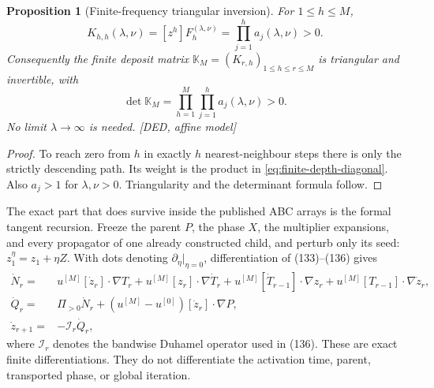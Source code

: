 \documentclass[11pt]{amsart}
\numberwithin{equation}{section}
\theoremstyle{plain}
\newtheorem{proposition}[theorem]{Proposition}
\theoremstyle{definition}
\theoremstyle{remark}
\begin{document}
\begin{proposition}[Finite-frequency triangular inversion]
\label{prop:finite-frequency-depth-inversion}
For $1\le h\le M$,
\begin{equation}
 K_{h,h}(\lambda,\nu)=[z^h]F_h^{(\lambda,\nu)}
 =\prod_{j=1}^h a_j(\lambda,\nu)>0.
\label{eq:finite-depth-diagonal}
\end{equation}
Consequently the finite deposit matrix
$\mathbb K_M=(K_{r,h})_{1\le h\le r\le M}$ is triangular and invertible,
with
\begin{equation}
 \det\mathbb K_M
 =\prod_{h=1}^M\prod_{j=1}^h a_j(\lambda,\nu)>0.
\label{eq:finite-depth-determinant}
\end{equation}
No limit $\lambda\to\infty$ is needed.  \textup{[DED, affine model]}
\end{proposition}

\begin{proof}
To reach zero from $h$ in exactly $h$ nearest-neighbour steps there is only
the strictly descending path.  Its weight is the product in
\eqref{eq:finite-depth-diagonal}.  Also $a_j>1$ for $\lambda,\nu>0$.
Triangularity and the determinant formula follow.
\end{proof}

The exact part that does survive inside the published ABC arrays is the
formal tangent recursion.  Freeze the parent $P$, the phase $X$, the
multiplier expansions, and every propagator of one already constructed
child, and perturb only its seed: $z_1^\eta=z_1+\eta Z$.  With dots denoting
$\partial_\eta|_{\eta=0}$, differentiation of (133)--(136) gives
\begin{align}
 \dot N_r={}&u^{[M]}[\dot z_r]\cdot\nabla T_r
 +u^{[M]}[z_r]\cdot\nabla\dot T_r
 +u^{[M]}[\dot T_{r-1}]\cdot\nabla z_r
 +u^{[M]}[T_{r-1}]\cdot\nabla\dot z_r,
\label{eq:ABC-exact-tangent-N}\\
 \dot Q_r={}&\Pi_{>0}\dot N_r
 +(u^{[M]}-u^{[0]})[\dot z_r]\cdot\nabla P,
\label{eq:ABC-exact-tangent-Q}\\
 \dot z_{r+1}={}&-\mathcal I_r\dot Q_r,
\label{eq:ABC-exact-tangent-z}
\end{align}
where $\mathcal I_r$ denotes the bandwise Duhamel operator used in (136).
These are exact finite differentiations.  They do not differentiate the
activation time, parent, transported phase, or global iteration.
\end{document}
